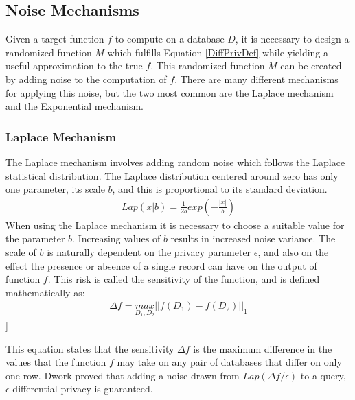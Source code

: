 \subsection{Noise Mechanisms}
Given a target function $f$ to compute on a database $D$, it is necessary to design a randomized function $M$ which fulfills Equation \ref{DiffPrivDef} while yielding a useful approximation to the true $f$. This randomized function $M$ can be created by adding noise to the computation of $f$. There are many different mechanisms for applying this noise, but the two most common are the Laplace mechanism and the Exponential mechanism. 

\subsubsection{Laplace Mechanism}
The Laplace mechanism involves adding random noise which follows the Laplace statistical distribution. The Laplace distribution centered around zero has only one parameter, its scale $b$, and this is proportional to its standard deviation. 
\begin{eqnarray} \label{LaplaceDisDef}
Lap(x|b) = \frac{1}{2b} exp (-\frac{|x|}{b})
\end{eqnarray}
When using the Laplace mechanism it is necessary to choose a suitable value for the parameter $b$. Increasing values of $b$ results in increased noise variance. The scale of $b$ is naturally dependent on the privacy parameter $\epsilon$, and also on the effect the presence or absence of a single record can have on the output of function $f$. This risk is called the sensitivity of the function, and is defined mathematically as:
\begin{eqnarray} \label{eq:sensitivity_def}
\Delta f=\underset{D_1,D_2}{max}||\mathit{f(D_1)}-\mathit{f(D_2)}||_{1}
 \end{eqnarray}
  ]

This equation states that the sensitivity $\Delta f$ is the maximum difference in the values that the function $f$ may take on any pair of databases that differ on only one row. Dwork proved that adding a noise drawn from $Lap(\Delta f/\epsilon)$ to a query, $\epsilon$-differential privacy\cite{dwork2013algorithmic} is guaranteed. 


